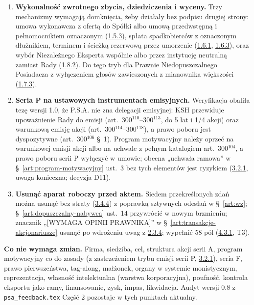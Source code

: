 \documentclass[12pt,a4paper]{report}
\begin{document}
\begin{enumerate}
  \item \textbf{Wykonalność zwrotnego zbycia, dziedziczenia i wyceny.} Trzy mechanizmy wymagają domknięcia, żeby działały bez podpisu drugiej strony: umowa wykonawcza z ofertą do Spółki albo umową przedwstępną i pełnomocnikiem oznaczonym (\hyperref[memo:1.5.3]{1.5.3}), spłata spadkobierców z oznaczonym dłużnikiem, terminem i ścieżką rezerwową przez umorzenie (\hyperref[memo:1.6.1]{1.6.1}, \hyperref[memo:1.6.3]{1.6.3}), oraz wybór Niezależnego Eksperta wspólnie albo przez instytucję neutralną zamiast Rady (\hyperref[memo:1.8.2]{1.8.2}). Do tego tryb dla Prawnie Niedopuszczalnego Posiadacza z wyłączeniem głosów zawieszonych z mianownika większości (\hyperref[memo:1.7.3]{1.7.3}).
  \item \textbf{Seria P na ustawowych instrumentach emisyjnych.} Weryfikacja obaliła tezę wersji 1.0, że P.S.A. nie zna delegacji emisyjnej: KSH przewiduje upoważnienie Rady do emisji (art.~300$^{110}$--300$^{113}$, do 5 lat i 1/4 akcji) oraz warunkową emisję akcji (art.~300$^{114}$--300$^{118}$), a prawo poboru jest dyspozytywne (art.~300$^{106}$ §~1). Program motywacyjny należy oprzeć na warunkowej emisji akcji albo na uchwale z pełnym katalogiem art.~300$^{104}$, a prawo poboru serii P wyłączyć w umowie; obecna „uchwała ramowa” w §~\ref{art:program-motywacyjny} ust.~3 bez tych elementów jest ryzykiem (\hyperref[memo:3.2.1]{3.2.1}, uwaga konieczna; decyzja D11).
  \item \textbf{Usunąć aparat roboczy przed aktem.} Siedem przekreślonych zdań można usunąć bez straty (\hyperref[memo:3.4.4]{3.4.4}) z poprawką sztywnych odesłań w §~\ref{art:wz}; §~\ref{art:dopuszczalny-nabywca} ust.~14 przywrócić w nowym brzmieniu; znacznik „[WYMAGA OPINII PRAWNIKA]” w §~\ref{art:transakcje-akcjonariusze} usunąć po wdrożeniu uwag z \hyperref[memo:2.3.4]{2.3.4}; wypełnić 58 pól (\hyperref[memo:4.3.1]{4.3.1}, T3).
\end{enumerate}

\textbf{Co nie wymaga zmian.} Firma, siedziba, cel, struktura akcji serii A, program motywacyjny co do zasady (z zastrzeżeniem trybu emisji serii P, \hyperref[memo:3.2.1]{3.2.1}), seria F, prawo pierwszeństwa, tag-along, małżonek, organy w systemie monistycznym, reprezentacja, własność intelektualna (warstwa korporacyjna), poufność, kontrola eksportu jako ramy, finansowanie, zysk, impas, likwidacja. Audyt wersji 0.8 z \texttt{psa\_feedback.tex} Część 2 pozostaje w tych punktach aktualny.
\end{document}
